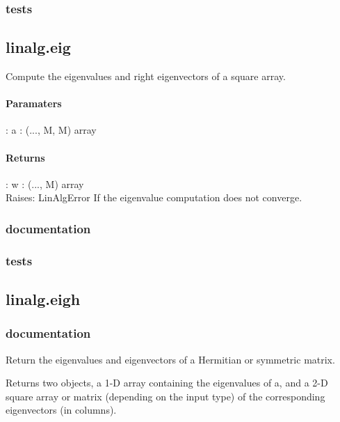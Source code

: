 \documentclass[a4paper,11pt]{article}
\begin{document}
\subsubsection{tests}


\subsection{linalg.eig}
Compute the eigenvalues and right eigenvectors of a square array.
\paragraph{Paramaters}: 
a : (..., M, M) array\\
\paragraph{Returns}:    
w : (..., M) array\\
Raises: 
LinAlgError
If the eigenvalue computation does not converge.

\subsubsection{documentation}
\subsubsection{tests}
\subsection{linalg.eigh}

\subsubsection{documentation}
Return the eigenvalues and eigenvectors of a Hermitian or symmetric matrix.

Returns two objects, a 1-D array containing the eigenvalues of a, and a 2-D square array or matrix (depending on the input type) of the corresponding eigenvectors (in columns).
\end{document}
